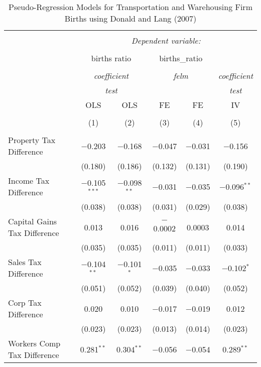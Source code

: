 
\begin{table}[!htbp] \centering 
  \caption{Pseudo-Regression Models for  Transportation and Warehousing Firm Births using Donald and Lang (2007)} 
  \label{} 
\begin{tabular}{@{\extracolsep{5pt}}lccccc} 
\\[-1.8ex]\hline 
\hline \\[-1.8ex] 
 & \multicolumn{5}{c}{\textit{Dependent variable:}} \\ 
\cline{2-6} 
\\[-1.8ex] & \multicolumn{2}{c}{births ratio} & \multicolumn{2}{c}{births\_ratio} &   \\ 
\\[-1.8ex] & \multicolumn{2}{c}{\textit{coefficient}} & \multicolumn{2}{c}{\textit{felm}} & \textit{coefficient} \\ 
 & \multicolumn{2}{c}{\textit{test}} & \multicolumn{2}{c}{\textit{}} & \textit{test} \\ 
 & OLS & OLS & FE & FE & IV \\ 
\\[-1.8ex] & (1) & (2) & (3) & (4) & (5)\\ 
\hline \\[-1.8ex] 
 Property Tax Difference & $-$0.203 & $-$0.168 & $-$0.047 & $-$0.031 & $-$0.156 \\ 
  & (0.180) & (0.186) & (0.132) & (0.131) & (0.190) \\ 
  Income Tax Difference & $-$0.105$^{***}$ & $-$0.098$^{**}$ & $-$0.031 & $-$0.035 & $-$0.096$^{**}$ \\ 
  & (0.038) & (0.038) & (0.031) & (0.029) & (0.038) \\ 
  Capital Gains Tax Difference & 0.013 & 0.016 & $-$0.0002 & 0.0003 & 0.014 \\ 
  & (0.035) & (0.035) & (0.011) & (0.011) & (0.033) \\ 
  Sales Tax Difference & $-$0.104$^{**}$ & $-$0.101$^{*}$ & $-$0.035 & $-$0.033 & $-$0.102$^{*}$ \\ 
  & (0.051) & (0.052) & (0.039) & (0.040) & (0.052) \\ 
  Corp Tax Difference & 0.020 & 0.010 & $-$0.017 & $-$0.019 & 0.012 \\ 
  & (0.023) & (0.023) & (0.013) & (0.014) & (0.023) \\ 
  Workers Comp Tax Difference & 0.281$^{**}$ & 0.304$^{**}$ & $-$0.056 & $-$0.054 & 0.289$^{**}$ \\ 

\end{tabular}
\end{table}
